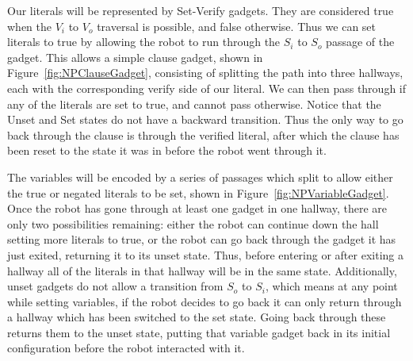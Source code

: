 Our literals will be represented by Set-Verify gadgets. They are considered true when the $V_i$ to $V_o$ traversal is possible, and false otherwise. Thus we can set literals to true by allowing the robot to run through the $S_i$ to $S_o$ passage of the gadget. This allows a simple clause gadget, shown in Figure~\ref{fig:NPClauseGadget}, consisting of splitting the path into three hallways, each with the corresponding verify side of our literal. We can then pass through if any of the literals are set to true, and cannot pass otherwise. Notice that the Unset and Set states do not have a backward transition. Thus the only way to go back through the clause is through the verified literal, after which the clause has been reset to the state it was in before the robot went through it.

The variables will be encoded by a series of passages which split to allow either the true or negated literals to be set, shown in Figure~\ref{fig:NPVariableGadget}. Once the robot has gone through at least one gadget in one hallway, there are only two possibilities remaining: either the robot can continue down the hall setting more literals to true, or the robot can go back through the gadget it has just exited, returning it to its unset state. Thus, before entering or after exiting a hallway all of the literals in that hallway will be in the same state. Additionally, unset gadgets do not allow a transition from $S_o$ to $S_i$, which means at any point while setting variables, if the robot decides to go back it can only return through a hallway which has been switched to the set state. Going back through these returns them to the unset state, putting that variable gadget back in its initial configuration before the robot interacted with it.

